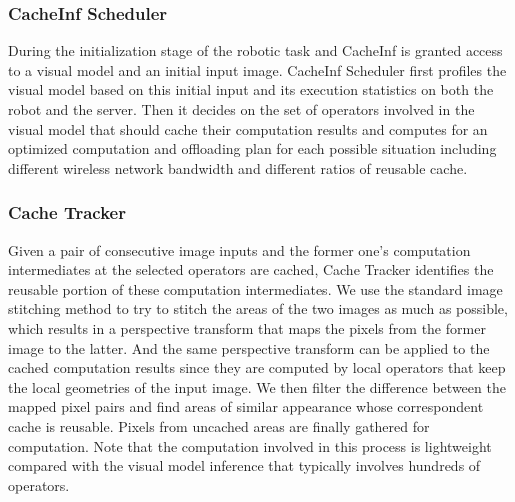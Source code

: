 \subsubsection{CacheInf Scheduler}
During the initialization stage of the robotic task and CacheInf is granted access to a visual model and an initial input image.
CacheInf Scheduler first profiles the visual model based on this initial input and its execution statistics on both the robot and the server.
Then it decides on the set of operators involved in the visual model that should cache their computation results and computes for an optimized computation and offloading plan for each possible situation including different wireless network bandwidth and different ratios of reusable cache.

\subsubsection{Cache Tracker}
Given a pair of consecutive image inputs and the former one's computation intermediates at the selected operators are cached, Cache Tracker identifies the reusable portion of these computation intermediates.
We use the standard image stitching method to try to stitch the areas of the two images as much as possible, which results in a perspective transform that maps the pixels from the former image to the latter.
And the same perspective transform can be applied to the cached computation results since they are computed by local operators that keep the local geometries of the input image.
We then filter the difference between the mapped pixel pairs and find areas of similar appearance whose correspondent cache is reusable.
Pixels from uncached areas are finally gathered for computation.
Note that the computation involved in this process is lightweight compared with the visual model inference that typically involves hundreds of operators.

